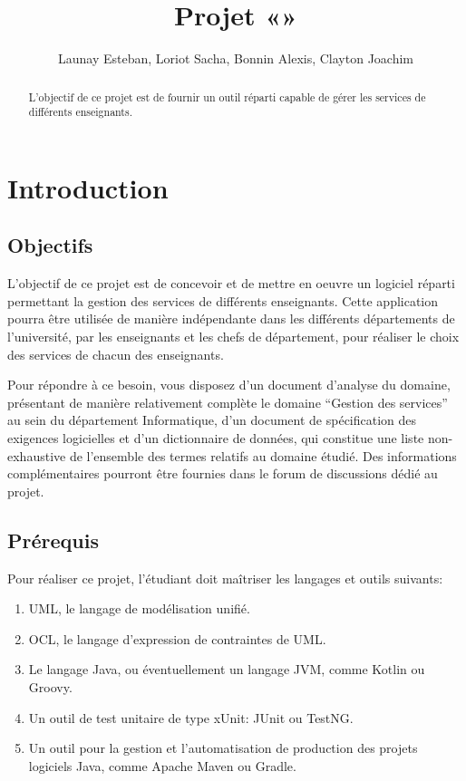 \documentclass[a4]{report}
\title{Projet «\projet»}
\author{Launay Esteban, Loriot Sacha, Bonnin Alexis, Clayton Joachim}
\begin{document}
\maketitle
{}

\begin{abstract}
L’objectif de ce projet  est de fournir un outil réparti capable de gérer les services de différents enseignants.
\end{abstract}


\tableofcontents


\chapter{Introduction}
\section{Objectifs}
L’objectif de ce projet est de concevoir et de mettre en oeuvre un logiciel réparti permettant la gestion des services de différents enseignants.
Cette application pourra être utilisée de manière indépendante dans les différents départements de l’université, par les enseignants et les chefs de département, pour réaliser le choix des services de chacun des enseignants.

Pour répondre à ce besoin, vous disposez d'un document d'analyse du domaine, présentant de manière relativement complète le domaine “Gestion des services” au sein du département Informatique, d'un document de spécification des exigences logicielles et d'un dictionnaire de données, qui constitue une liste non-exhaustive de l’ensemble des termes relatifs au domaine étudié.
Des informations complémentaires pourront être fournies dans le forum de discussions dédié au projet.



\section{Prérequis}

Pour réaliser ce projet, l'étudiant doit maîtriser les langages et outils suivants:
\begin{enumerate}
	\item UML, le langage de modélisation unifié.
	\item OCL, le langage d'expression de contraintes de UML.
	\item Le langage Java, ou éventuellement  un langage JVM, comme Kotlin ou Groovy.
	\item Un outil de test unitaire de type xUnit: JUnit ou TestNG.
	\item Un outil pour la gestion et l'automatisation de production des projets logiciels Java, comme Apache Maven ou Gradle.
\end{enumerate}
\end{document}
